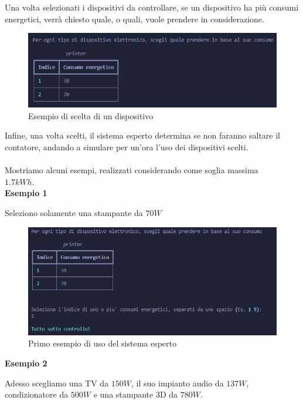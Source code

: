 \documentclass[12pt, letterpaper]{article}
\begin{document}
\noindent Una volta selezionati i dispositivi da controllare, se un dispositivo ha più consumi energetici,
verrà chiesto quale, o quali, vuole prendere in considerazione. \\ \pagebreak

\begin{figure}[h]
      \centering
      \includegraphics[scale=0.7]{printer-choose.png}
      \caption{Esempio di scelta di un dispositivo}
\end{figure}

\noindent Infine, una volta scelti, il sistema esperto determina se non faranno saltare il
contatore, andando a simulare per un'ora l'uso dei dispositivi scelti. \\ \\
Mostriamo alcuni esempi, realizzati considerando come soglia massima \\ $1.7kWh$. \\

\noindent \textbf{Esempio 1}

\noindent Seleziono solamente una stampante da $70W$

\begin{figure}[h]
      \centering
      \includegraphics[scale=0.70]{sistema-esperto-esempio-1.png}
      \caption{Primo esempio di uso del sistema esperto}
\end{figure}

\noindent \textbf{Esempio 2}

\noindent Adesso scegliamo una TV da $150W$, il suo impianto audio da $137W$, condizionatore da $500W$ e una
stampante 3D da $780W$.
\end{document}
